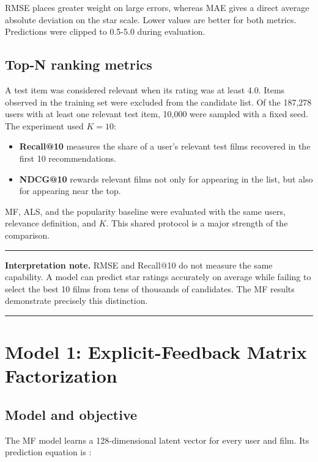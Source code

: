 \documentclass[11pt,a4paper]{article}
\newenvironment{keybox}
{\begin{center}\begin{minipage}{0.93\textwidth}\color{Ink}\hrule\vspace{0.7em}}
{\vspace{0.7em}\hrule\end{minipage}\end{center}}
\begin{document}
RMSE places greater weight on large errors, whereas MAE gives a direct average absolute deviation on the star scale. Lower values are better for both metrics. Predictions were clipped to 0.5-5.0 during evaluation.

\subsection{Top-N ranking metrics}

A test item was considered relevant when its rating was at least 4.0. Items observed in the training set were excluded from the candidate list. Of the 187,278 users with at least one relevant test item, 10,000 were sampled with a fixed seed. The experiment used $K=10$:

\begin{itemize}
  \item \textbf{Recall@10} measures the share of a user's relevant test films recovered in the first 10 recommendations.
  \item \textbf{NDCG@10} rewards relevant films not only for appearing in the list, but also for appearing near the top.
\end{itemize}

MF, ALS, and the popularity baseline were evaluated with the same users, relevance definition, and $K$. This shared protocol is a major strength of the comparison.

\begin{keybox}
\textbf{Interpretation note.} RMSE and Recall@10 do not measure the same capability. A model can predict star ratings accurately on average while failing to select the best 10 films from tens of thousands of candidates. The MF results demonstrate precisely this distinction.
\end{keybox}

\section{Model 1: Explicit-Feedback Matrix Factorization}
\label{sec:mf}

\subsection{Model and objective}

The MF model learns a 128-dimensional latent vector for every user and film. Its prediction equation is \cite{koren2009mf}:
\end{document}
